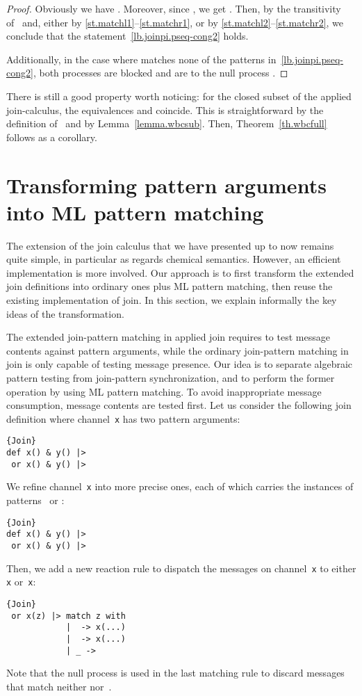 \documentclass{LMCS}
\let \lst \lstinline
\newcommand{\forget}[1]{}
\renewcommand{\_}{\mathord{\rule[-.25ex]{1ex}{.15ex}}}
\begin{document}
\begin{proof}
  Obviously we have . Moreover, since , we get . Then, by the transitivity
  of~ and, either by \eqref{st.matchl1}--\eqref{st.matchr1}, or
  by \eqref{st.matchl2}--\eqref{st.matchr2}, we conclude that the
  statement~\eqref{lb.joinpi.pseq-cong2} holds.

  Additionally, in the case where  matches none of the patterns
  in~\eqref{lb.joinpi.pseq-cong2}, both processes are blocked
  and are  to the null process . \forget{\qed}
\end{proof}

There is still a good property worth noticing: for the closed
subset of the applied join-calculus,  the equivalences  and 
coincide. This is straightforward by the definition of~
and by Lemma~\ref{lemma.wbcsub}.
Then, Theorem~\ref{th.wbcfull} follows as a corollary.

\section{Transforming pattern arguments into ML pattern matching}
\label{sec.trans-idea}

The extension of the join calculus that we have presented up to now
remains quite  simple, in particular as regards chemical
semantics. However, an efficient implementation is more involved. Our
approach is to first transform the extended join definitions into
ordinary ones plus ML pattern matching, then reuse the existing
implementation of join. In this section, we explain informally the
key ideas of the transformation.

The extended join-pattern matching in applied join requires to test
message contents against pattern arguments, while the ordinary
join-pattern matching in join is only capable of testing message
presence.  Our idea is to separate algebraic pattern testing from
join-pattern synchronization, and to perform the former operation by
using ML pattern matching.  To avoid inappropriate message
consumption, message contents are tested first.  Let us consider the
following join definition where channel~\lst"x" has two pattern
arguments:
\begin{lstlisting}{Join}
def x() & y() |> 
 or x() & y() |> 
\end{lstlisting}
We refine channel~\lst"x" into more precise ones, each
of which carries the instances of patterns~ or :
\begin{lstlisting}{Join}
def x() & y() |> 
 or x() & y() |> 
\end{lstlisting}
Then, we add a new reaction rule to dispatch the messages on
channel~\lst"x" to either \lst"x" or~\lst"x":
\begin{lstlisting}{Join}
 or x(z) |> match z with
            |  -> x(...)
            |  -> x(...)
            | _ -> 
\end{lstlisting}
Note that the null process is used in the last matching rule to discard
messages that match neither  nor~.
\end{document}
